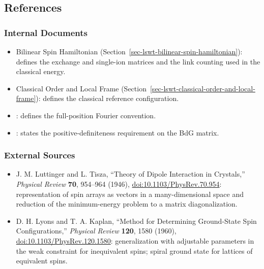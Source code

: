 \subsection{References}

\subsubsection{Internal Documents}

\begin{itemize}
\tightlist
\item
  Bilinear Spin Hamiltonian (Section~\ref{sec-lswt-bilinear-spin-hamiltonian}): defines the exchange and single-ion matrices and the link counting used in the classical energy.
\item
  Classical Order and Local Frame (Section~\ref{sec-lswt-classical-order-and-local-frame}): defines the classical reference configuration.
\item
  : defines the full-position Fourier convention.
\item
  : states the positive-definiteness requirement on the BdG matrix.
\end{itemize}

\subsubsection{External Sources}

\begin{itemize}
\tightlist
\item
  J. M. Luttinger and L. Tisza, ``Theory of Dipole Interaction in Crystals,'' \emph{Physical Review} \textbf{70}, 954--964 (1946), \href{https://doi.org/10.1103/PhysRev.70.954}{doi:10.1103/PhysRev.70.954}: representation of spin arrays as vectors in a many-dimensional space and reduction of the minimum-energy problem to a matrix diagonalization.
\item
  D. H. Lyons and T. A. Kaplan, ``Method for Determining Ground-State Spin Configurations,'' \emph{Physical Review} \textbf{120}, 1580 (1960), \href{https://doi.org/10.1103/PhysRev.120.1580}{doi:10.1103/PhysRev.120.1580}: generalization with adjustable parameters in the weak constraint for inequivalent spins; spiral ground state for lattices of equivalent spins.
\end{itemize}
